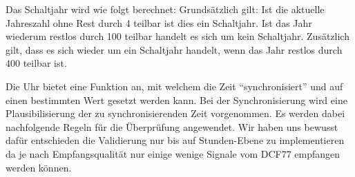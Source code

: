 Das Schaltjahr wird wie folgt berechnet: Grundsätzlich gilt: Ist die aktuelle Jahreszahl ohne Rest durch 4 teilbar ist dies ein Schaltjahr. Ist das Jahr wiederum restlos durch 100 teilbar handelt es sich um kein Schaltjahr. Zusätzlich gilt, dass es sich wieder um ein Schaltjahr handelt, wenn das Jahr restlos durch 400 teilbar ist.

Die Uhr bietet eine Funktion an, mit welchem die Zeit "`synchronisiert"' und auf einen bestimmten Wert gesetzt werden kann. Bei der Synchronisierung wird eine Plausibilisierung der zu synchronisierenden Zeit vorgenommen. Es werden dabei nachfolgende Regeln für die Überprüfung angewendet. Wir haben uns bewusst dafür entschieden die Validierung nur bis auf Stunden-Ebene zu implementieren da je nach Empfangsqualität nur einige wenige Signale vom DCF77 empfangen werden können.

